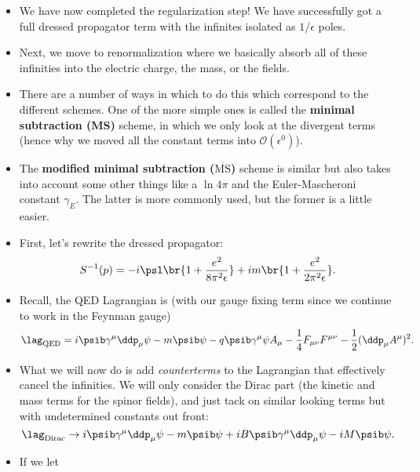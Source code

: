 \begin{itemize}
    \item We have now completed the regularization step! We have successfully got a full dressed propagator term with the infinites isolated as $1/\epsilon$ poles.
    \item Next, we move to renormalization where we basically absorb all of these infinities into the electric charge, the mass, or the fields.
    \item There are a number of ways in which to do this which correspond to the different schemes. One of the more simple ones is called the \textbf{minimal subtraction (MS)} scheme, in which we only look at the divergent terms (hence why we moved all the constant terms into $\mathcal{O}(\epsilon^0)$).
    \item The \textbf{modified minimal subtraction ($\overline{\mathrm{MS}}$)} scheme is similar but also takes into account some other things like a $\ln4\pi$ and the Euler-Mascheroni constant $\gamma_E$. The latter is more commonly used, but the former is a little easier.
    \item First, let's rewrite the dressed propagator:
        \begin{equation}
            S^{-1}(p) = -i\psl  \br{1 + \frac{e^2}{8\pi^2\epsilon}} + im \br{1 + \frac{e^2}{2\pi^2\epsilon}}.
        \end{equation}
    \item Recall, the QED Lagrangian is (with our gauge fixing term since we continue to work in the Feynman gauge)
        \begin{equation}
            \lag_{\mathrm{QED}} = i\psib \gamma^{\mu}\ddp_{\mu} \psi - m\psib\psi - q\psib \gamma^{\mu} \psi A_{\mu} - \frac{1}{4}F_{\mu\nu}F^{\mu\nu} - \frac{1}{2}(\ddp_{\mu}A^{\mu})^2.
        \end{equation}
    \item What we will now do is add \textit{counterterms} to the Lagrangian that effectively cancel the infinities. We will only consider the Dirac part (the kinetic and mass terms for the spinor fields), and just tack on similar looking terms but with undetermined constants out front:
        \begin{equation}
            \lag_{\mathrm{Dirac}} \rightarrow i\psib \gamma^{\mu}\ddp_{\mu} \psi - m\psib\psi + iB\psib \gamma^{\mu}\ddp_{\mu} \psi - iM\psib\psi.
        \end{equation}
    \item If we let 
        \begin{equation}

\end{equation}
\end{itemize}
